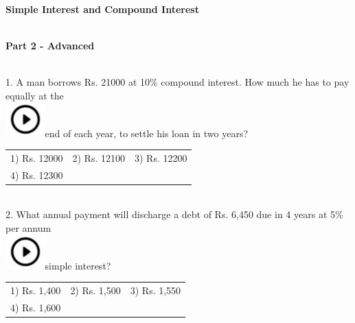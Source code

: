 \documentclass{article}
\begin{document}
	
	\noindent \begin{center}
		{\Large \textbf{Simple Interest and Compound Interest \\  }}
	\end{center}
	
	\noindent 
	
	\noindent 
	
	\noindent \\   \textbf{Part 2 - Advanced \\  }
	
	\noindent 
	
	\noindent \\  
	
	1.   A man borrows Rs. 21000 at 10\% compound interest. How much he has to pay equally at the \noindent \\ \includegraphics*[width=0.60in, height=0.52in]{images/image1}end of each year, to settle his loan in two years?
	
	\noindent \begin{tabular}{p{1.7in} p{1.6in} p{1.6in}} \\ 
 1) Rs. 12000           & 2) Rs. 12100     & 3) Rs. 12200     \\
4) Rs. 12300 \\
\end{tabular}
	
	\noindent 
	
	\noindent 
	
	\noindent  \\  
	
	2.   What annual payment will discharge a debt of Rs. 6,450 due in 4 years at 5\% per annum \noindent \\ \includegraphics*[width=0.60in, height=0.52in]{images/image1}simple interest?
	
	\noindent \begin{tabular}{p{1.7in} p{1.6in} p{1.6in}} \\ 
 1) Rs. 1,400            & 2) Rs. 1,500      & 3) Rs. 1,550      \\
4) Rs. 1,600 \\
\end{tabular}
	
\end{document}
